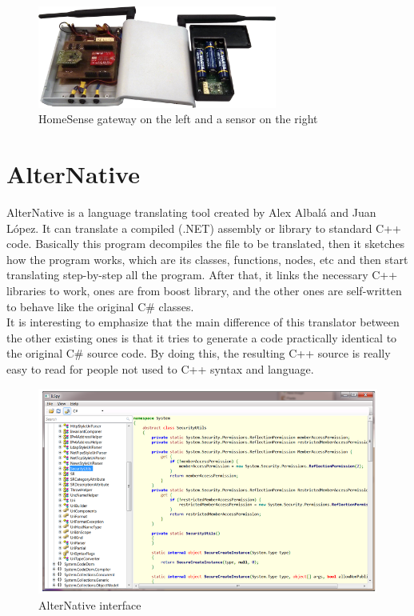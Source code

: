 \begin{figure}[H]\begin{center}
 \centering
  \captionsetup{justification=centering}
  \includegraphics[width=0.7\textwidth]{pictures/proposal/homesense}
  \caption{HomeSense gateway on the left and a sensor on the right\label{fig:Proposal-HomeSense}}
\end{center}\end{figure}

\section{AlterNative}\label{S:Proposal-AlterNative}
AlterNative is a language translating tool created by Alex Albal\'{a} and Juan L\'{o}pez. It can translate a compiled (.NET) assembly or library to standard C++ code. Basically this program decompiles the file to be translated, then it sketches how the program works, which are its classes, functions, nodes, etc and then start translating step-by-step all the program. After that, it links the necessary C++ libraries to work, ones are from boost library, and the other ones are self-written to behave like the original C\# classes.
\\
It is interesting to emphasize that the main difference of this translator between the other existing ones is that it tries to generate a code practically identical to the original C\# source code. By doing this, the resulting C++ source is really easy to read for people not used to C++ syntax and language.
\begin{figure}[H]\begin{center}
 \centering
  \captionsetup{justification=centering}
 \includegraphics[scale=0.65]{pictures/proposal/alternativeUI}
  \caption{AlterNative interface \label{fig:Proposal-AN}}
\end{center}\end{figure}

